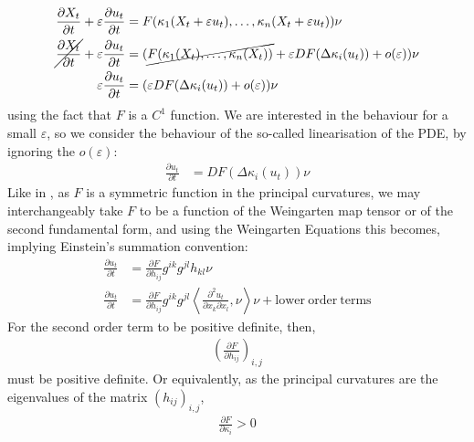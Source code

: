 \begin{align*}
		\frac{\partial X_t}{\partial t} + \varepsilon\frac{\partial u_t}{\partial t}  &= F(\kappa_1(X_t+\varepsilon u_t), \dots , \kappa_n(X_t+\varepsilon u_t)) \nu\\
		\cancel{\frac{\partial X_t}{\partial t}} + \varepsilon\frac{\partial u_t}{\partial t}  &= (\cancel{F(\kappa_1(X_t), \dots , \kappa_n(X_t))} + \varepsilon DF(\Delta\kappa_i(u_t)) +o(\varepsilon)) \nu \\
		\varepsilon\frac{\partial u_t}{\partial t}  &= (\varepsilon DF(\Delta\kappa_i(u_t)) +o(\varepsilon)) \nu
\end{align*}
using the fact that $F$ is a $C^1$ function. We are interested in the behaviour for a small $\varepsilon$, so we consider the behaviour of the so-called linearisation of the PDE, by ignoring the $o(\varepsilon)$:
\begin{align*}
	\frac{\partial u_t}{\partial t}  &=  DF(\Delta\kappa_i(u_t)) \nu
\end{align*}
Like in \cite{huisken}, as $F$ is a symmetric function in the principal curvatures, we may interchangeably take $F$ to be a function of the Weingarten map tensor or of the second fundamental form, and using the Weingarten Equations this becomes, implying Einstein's summation convention: 
\begin{align*}
	\frac{\partial u_t}{\partial t} &= \frac{\partial F}{\partial h_{i j}} g^{i k}g^{jl}h_{k l} \nu\\
	\frac{\partial u_t}{\partial t} &= \frac{\partial F}{\partial h_{i j}} g^{i k}g^{jl}\left\langle \frac{\partial^2 u_t}{\partial x_k\partial x_l} , \nu \right\rangle \nu+ \mathrm{lower \ order \ terms}
\end{align*}
For the second order term to be positive definite, then, 
\begin{align*}
		\left(\frac{\partial F}{\partial h_{i j}} \right)_{i, j}
\end{align*}
must be positive definite. Or equivalently, as the principal curvatures are the eigenvalues of the matrix $(h_{i j})_{i, j}$,
\begin{align*}
	\frac{\partial F}{\partial \kappa_{i}} > 0
\end{align*}

